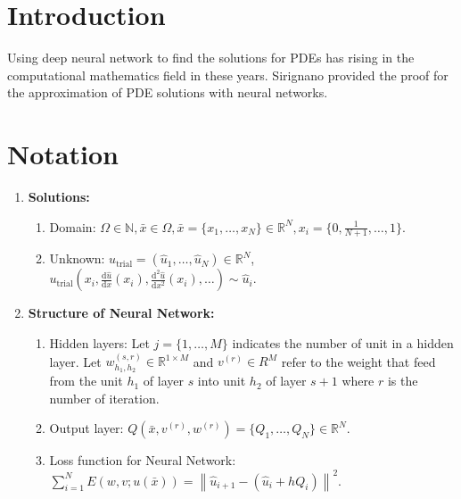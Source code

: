 \documentclass{article}
\begin{document}
	\tableofcontents
	\section{Introduction}
	Using deep neural network to find the solutions for PDEs has rising in the computational mathematics field in these years. Sirignano \cite{sirignano} provided the proof for the approximation of PDE solutions with neural networks. 
	\section{Notation}
	\begin{enumerate}
		
		
		\item \textbf{Solutions:} 
		\begin{enumerate}
			\item Domain: $\Omega \in \mathbb{N}, \bar{x} \in \Omega, \bar{x}=\{x_1, \dots, x_N\} \in \mathbb{R}^{N}, x_i=\{0, \frac{1}{N+1}, \dots , 1 \}.$
			\item Unknown:   $u_{\text{trial}}= (\hat{u}_{1}, \dots , \hat{u}_{N}) \in \mathbb{R}^{N}$, $u_{\text{trial}}(x_i, \frac{\mathrm{d}\hat{u}}{\mathrm{d}x}(x_i), \frac{\mathrm{d}^{2}\hat{u}}{\mathrm{d}x^{2}}(x_i), \dots) \sim \hat{u}_{i}$. 
		\end{enumerate}
	\item \textbf{Structure of Neural Network:} 
	\begin{enumerate}
		\item Hidden layers: Let $j=\{1, \dots, M\}$ indicates the number of unit in a hidden layer.  Let $w_{h_{1},h_{2}}^{(s,r)} \in \mathbb{R}^{1 \times M}$ and $v^{(r)} \in R^{M}$ refer to the weight that feed from the unit $h_{1}$ of layer $s$ into unit $h_{2}$ of layer $s+1$ where $r$ is the number of iteration. 
		\item Output layer:  $Q(\bar{x},v^{(r)},w^{(r)})=\{Q_1, \dots, Q_N\} \in \mathbb{R}^N$.
		\item Loss function for Neural Network: 
		$\sum_{i=1}^{N} E(w,v;u(\bar{x})) = \left \| \hat{u}_{i+1} - (\hat{u}_{i}+hQ_{i}) \right\|^{2}$.
	\end{enumerate}
		
		
	
	\end{enumerate}
	
	
	
\end{document}
